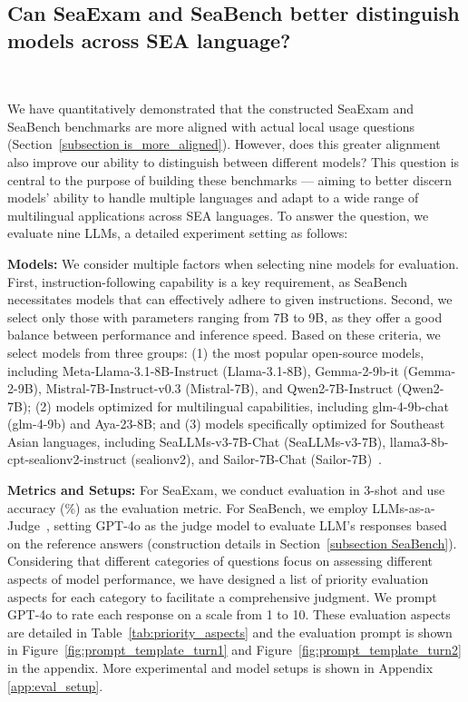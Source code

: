 \subsection{Can SeaExam and SeaBench better distinguish models across SEA language?}~\label{subsection better distinguish models}


We have quantitatively demonstrated that the constructed SeaExam and SeaBench benchmarks are more aligned with actual local usage questions (Section~\ref{subsection is_more_aligned}). However, does this greater alignment also improve our ability to distinguish between different models? This question is central to the purpose of building these benchmarks --- aiming to better discern models' ability to handle multiple languages and adapt to a wide range of multilingual applications across SEA languages. To answer the question, we evaluate nine LLMs, a detailed experiment setting as follows:

\textbf{Models:}
We consider multiple factors when selecting nine models for evaluation. First, instruction-following capability is a key requirement, as SeaBench necessitates models that can effectively adhere to given instructions. Second, we select only those with parameters ranging from 7B to 9B, as they offer a good balance between performance and inference speed. Based on these criteria, we select models from three groups: (1) the most popular open-source models, including Meta-Llama-3.1-8B-Instruct (Llama-3.1-8B)\cite{dubey_llama_2024}, Gemma-2-9b-it (Gemma-2-9B)\cite{gemma_team_gemma_2024}, Mistral-7B-Instruct-v0.3 (Mistral-7B)\cite{jiang_mistral_2023}, and Qwen2-7B-Instruct (Qwen2-7B)\cite{yang_qwen2_2024}; (2) models optimized for multilingual capabilities, including glm-4-9b-chat (glm-4-9b)\cite{glm_chatglm_2024} and Aya-23-8B\cite{aryabumi_aya_2024}; and (3) models specifically optimized for Southeast Asian languages, including SeaLLMs-v3-7B-Chat (SeaLLMs-v3-7B)\cite{zhang_seallms_2024}, llama3-8b-cpt-sealionv2-instruct (sealionv2)\cite{sea_lion_2024}, and Sailor-7B-Chat (Sailor-7B)~\cite{dou_sailor_2024}.

\textbf{Metrics and Setups:} 
For SeaExam, we conduct evaluation in 3-shot and use accuracy (\%) as the evaluation metric. For SeaBench, we employ LLMs-as-a-Judge~\cite{zheng_judging_2023, bai2023benchmarkingfoundationmodelslanguagemodelasanexaminer,ying2024automatingdatasetupdatesreliable}, setting GPT-4o as the judge model to evaluate LLM's responses based on the reference answers (construction details in Section~\ref{subsection SeaBench}). Considering that different categories of questions focus on assessing different aspects of model performance, we have designed a list of priority evaluation aspects for each category to facilitate a comprehensive judgment. We prompt GPT-4o to rate each response on a scale from 1 to 10.
These evaluation aspects are detailed in Table~\ref{tab:priority_aspects} and the evaluation prompt is shown in Figure~\ref{fig:prompt_template_turn1} and Figure~\ref{fig:prompt_template_turn2} in the appendix. More experimental and model setups is shown in Appendix \ref{app:eval_setup}.


